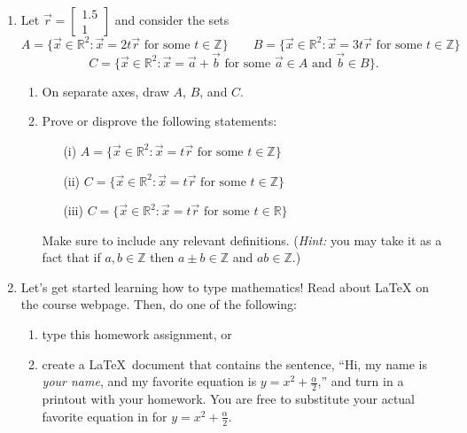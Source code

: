 \documentclass[letter]{article}
\newcommand{\R}{\mathbb{R}}
\newcommand{\Z}{\mathbb{Z}}
\newcommand{\mat}[1]{\begin{bmatrix}#1\end{bmatrix}}
\begin{document}
\begin{enumerate}
		\item Let $\vec r=\mat{1.5\\1}$ and consider the sets
		\[
			A=\{\vec x\in\R^2:\vec x=2t\vec r\text{ for some }t\in\Z\}
			\qquad
			B=\{\vec x\in\R^2:\vec x=3t\vec r\text{ for some }t\in\Z\}
		\]
		\[
			C=\{\vec x\in\R^2:\vec x=\vec a+\vec b\text{ for some }\vec a\in A\text{ and }\vec b\in B\}.
		\]
		\begin{enumerate}
			\item On separate axes, draw $A$, $B$, and $C$.
			\item Prove or disprove the following statements:
			\begin{enumerate}
				\item[(i)] $A=\{\vec x\in\R^2:\vec x=t\vec r\text{ for some }t\in\Z\}$
				\item[(ii)] $C=\{\vec x\in\R^2:\vec x=t\vec r\text{ for some }t\in\Z\}$
				\item[(iii)] $C=\{\vec x\in\R^2:\vec x=t\vec r\text{ for some }t\in\R\}$
			\end{enumerate}
			Make sure to include any relevant definitions. (\emph{Hint:} you may take
			it as a fact that if $a,b\in \Z$ then $a\pm b\in\Z$ and $ab\in \Z$.)
		\end{enumerate}

		\item Let's get started learning how to type mathematics!
			Read about \LaTeX{} on the course webpage.  Then, do one of the following:
			\begin{enumerate}
				\item type this homework assignment, or
				\item create a \LaTeX\ document that contains the sentence, ``Hi, my name is \emph{your name},
					and my favorite equation is $y=x^2+\frac{\alpha}{2}$,'' and turn in a printout
					with your homework. You are free to substitute your
					actual favorite equation in for $y=x^2+\frac{\alpha}{2}$.
			\end{enumerate}
	\end{enumerate}
\end{document}
